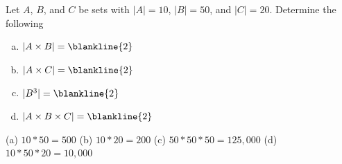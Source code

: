 \begin{exer}
Let $A$, $B$, and $C$ be sets with $|A|=10$, $|B|=50$, and $|C|=20$.
Determine the following
\begin{enumerate}[(a)]
\item $|A\times B| = \blankline{2}$
\item $|A\times C| = \blankline{2}$
\item $|B^3| = \blankline{2}$
\item $|A\times B\times C| = \blankline{2}$
\end{enumerate}
\begin{answer}
(a) $10*50=500$
(b) $10*20=200$
(c) $50*50*50=125,000$
(d) $10*50*20=10,000$
\end{answer}
\end{exer}

